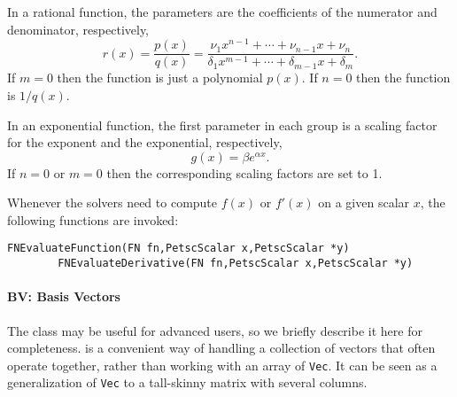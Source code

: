 In a rational function, the parameters are the coefficients of the numerator and denominator, respectively,
\begin{equation}
r(x)=\frac{p(x)}{q(x)}
=\frac{\nu_1x^{n-1}+\cdots+\nu_{n-1}x+\nu_{n}}{\delta_1x^{m-1}+\cdots+\delta_{m-1}x+\delta_m}.
\end{equation}
If $m=0$ then the function is just a polynomial $p(x)$. If $n=0$ then the function is $1/q(x)$.

In an exponential function, the first parameter in each group is a scaling factor for the exponent and the exponential, respectively,
\begin{equation}
g(x)=\beta e^{\alpha x}.
\end{equation}
If $n=0$ or $m=0$ then the corresponding scaling factors are set to 1.

Whenever the solvers need to compute $f(x)$ or $f'(x)$ on a given scalar $x$, the following functions are invoked:
	\begin{Verbatim}[fontsize=\small]
        FNEvaluateFunction(FN fn,PetscScalar x,PetscScalar *y)
        FNEvaluateDerivative(FN fn,PetscScalar x,PetscScalar *y)
	\end{Verbatim}


\paragraph{BV: Basis Vectors}

The  class may be useful for advanced users, so we briefly describe it here for completeness.  is a convenient way of handling a collection of vectors that often operate together, rather than working with an array of \texttt{Vec}. It can be seen as a generalization of \texttt{Vec} to a tall-skinny matrix with several columns.

